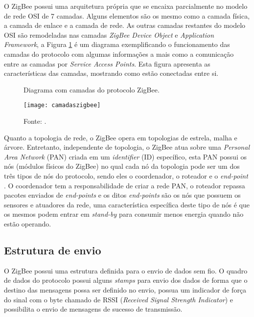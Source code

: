 O ZigBee possui uma arquitetura própria que se encaixa parcialmente no modelo de rede OSI de 7 camadas\cite{gislason2008zigbee}. Alguns elementos são os mesmo como a camada física, a camada de enlace e a camada de rede. As outras camadas restantes do modelo OSI são remodeladas nas camadas \textit{ZigBee Device Object} e \textit{Application Framework}, a Figura \ref{fig:camadaszigbee} é um diagrama exemplificando o funcionamento das camadas do protocolo com algumas informações a mais como a comunicação entre as camadas por \textit{Service Access Points}. Esta figura apresenta as características das camadas, mostrando como estão conectadas entre si.


\begin{figure}[!htb]
	\centering
		\caption{Diagrama com camadas do protocolo ZigBee.}
		\texttt{[image: camadaszigbee]} 
		\caption*{Fonte: \cite{gislason2008zigbee}.}
		\label{fig:camadaszigbee}
\end{figure} 

Quanto a topologia de rede, o ZigBee opera em topologias de estrela, malha e árvore. Entretanto, independente de topologia, o ZigBee atua sobre uma \textit{Personal Area Network} (PAN) criada em um \textit{identifier} (ID) específico, esta PAN possui os nós (módulos físicos do ZigBee) no qual cada nó da topologia pode ser um dos três tipos de nós do protocolo, sendo eles o coordenador, o roteador e o \textit{end-point} \cite{elahi2009zigbee}. O coordenador tem a responsabilidade de criar a rede PAN, o roteador repassa pacotes enviados de \textit{end-points} e os ditos \textit{end-points} são os nós que possuem os sensores e atuadores da rede, uma característica específica deste tipo de nós é que os mesmos podem entrar em \textit{stand-by} para consumir menos energia quando não estão operando.    

\subsection{Estrutura de envio}
O ZigBee possui uma estrutura definida para o envio de dados sem fio. O quadro de dados do protocolo possui alguns \textit{stamps} para envio dos dados de forma que o destino das mensagens possa ser definido no envio, possua um indicador de força do sinal com o byte chamado de RSSI (\textit{Received Signal Strength Indicator}) e possibilita o envio de mensagens de sucesso de transmissão. 

